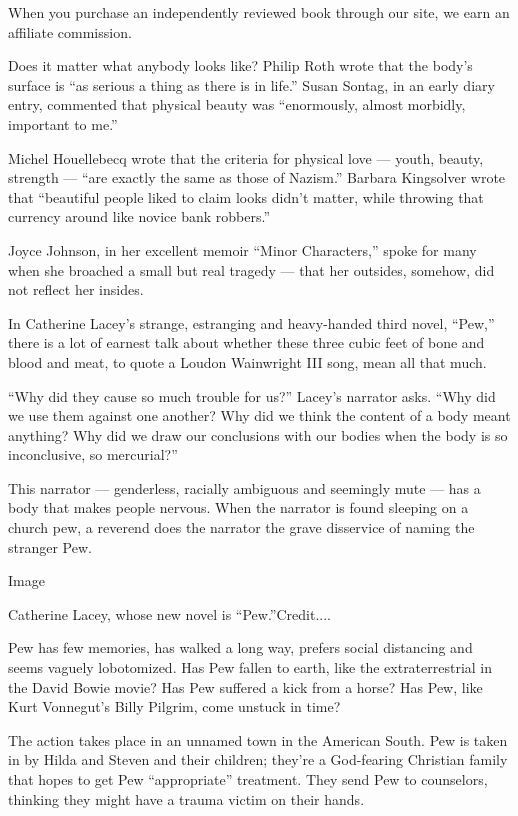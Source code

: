 When you purchase an independently reviewed book through our site, we
earn an affiliate commission.

Does it matter what anybody looks like? Philip Roth wrote that the
body's surface is ``as serious a thing as there is in life.'' Susan
Sontag, in an early diary entry, commented that physical beauty was
``enormously, almost morbidly, important to me.''

Michel Houellebecq wrote that the criteria for physical love --- youth,
beauty, strength --- ``are exactly the same as those of Nazism.''
Barbara Kingsolver wrote that ``beautiful people liked to claim looks
didn't matter, while throwing that currency around like novice bank
robbers.''

Joyce Johnson, in her excellent memoir ``Minor Characters,'' spoke for
many when she broached a small but real tragedy --- that her outsides,
somehow, did not reflect her insides.

In Catherine Lacey's strange, estranging and heavy-handed third novel,
``Pew,'' there is a lot of earnest talk about whether these three cubic
feet of bone and blood and meat, to quote a Loudon Wainwright III song,
mean all that much.

``Why did they cause so much trouble for us?'' Lacey's narrator asks.
``Why did we use them against one another? Why did we think the content
of a body meant anything? Why did we draw our conclusions with our
bodies when the body is so inconclusive, so mercurial?''

This narrator --- genderless, racially ambiguous and seemingly mute ---
has a body that makes people nervous. When the narrator is found
sleeping on a church pew, a reverend does the narrator the grave
disservice of naming the stranger Pew.

Image

Catherine Lacey, whose new novel is ``Pew.''Credit....

Pew has few memories, has walked a long way, prefers social distancing
and seems vaguely lobotomized. Has Pew fallen to earth, like the
extraterrestrial in the David Bowie movie? Has Pew suffered a kick from
a horse? Has Pew, like Kurt Vonnegut's Billy Pilgrim, come unstuck in
time?

The action takes place in an unnamed town in the American South. Pew is
taken in by Hilda and Steven and their children; they're a God-fearing
Christian family that hopes to get Pew ``appropriate'' treatment. They
send Pew to counselors, thinking they might have a trauma victim on
their hands.

